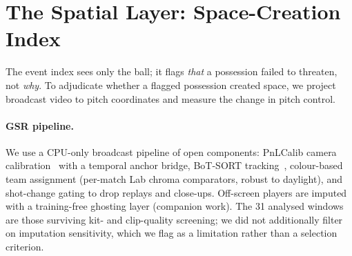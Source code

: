 \documentclass[11pt]{article}
\begin{document}
\section{The Spatial Layer: Space-Creation Index}
\label{sec:sci}

The event index sees only the ball; it flags \emph{that} a possession failed to
threaten, not \emph{why}. To adjudicate whether a flagged possession created
space, we project broadcast video to pitch coordinates and measure the change
in pitch control.

\paragraph{GSR pipeline.} We use a CPU-only broadcast pipeline of open
components: PnLCalib camera calibration~\citep{gutierrez2024pnlcalib} with a
temporal anchor bridge, BoT-SORT tracking~\citep{aharon2022botsort},
colour-based team assignment (per-match Lab chroma comparators, robust to
daylight), and shot-change gating to drop replays and close-ups. Off-screen
players are imputed with a training-free ghosting layer (companion work). The 31
analysed windows are those surviving kit- and clip-quality screening; we did not
additionally filter on imputation sensitivity, which we flag as a limitation
rather than a selection criterion.
\end{document}
